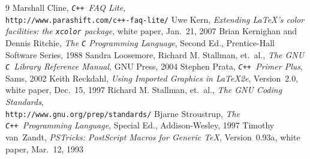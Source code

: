 \documentclass[12pt,letterpaper]{book}
\newcommand{\code}[1]{\texttt{#1}}
\newcommand{\URL}[1]{\texttt{#1}}
\newcommand{\CXX}{\code{C++}}
\newcommand{\texicomment}{}
\begin{document}
\texicomment
\begin{thebibliography}{9}
%
 Marshall Cline, \emph{\CXX\ FAQ Lite}, \\
  \URL{http://www.parashift.com/c++-faq-lite/}
%
 Uwe Kern, \emph{Extending \LaTeX's color facilities:
  the \code{xcolor} package}, white paper, Jan.~21, 2007
%
 Brian Kernighan and Dennis Ritchie, \emph{The \code{C}
    Programming Language}, Second Ed., Prentice-Hall Software Series,
    1988
%
 Sandra Loosemore, Richard M. Stallman, et.\ al.,
    \emph{The GNU \code{C}~Library Reference Manual}, GNU Press,
    2004
%
 Stephen Prata, \emph{\CXX\ Primer Plus}, Sams, 2002
%
 Keith Reckdahl, \emph{Using Imported Graphics in
  \LaTeX2e}, Version~2.0, white paper, Dec.~15, 1997
%
 Richard M. Stallman, et.\ al., \emph{The GNU
  Coding Standards}, \\
  \URL{http://www.gnu.org/prep/standards/}
%
 Bjarne Stroustrup, \emph{The \CXX\ Programming Language},
  Special Ed., Addison-Wesley, 1997
%
 Timothy van~Zandt, \emph{PSTricks: PostScript Macros for
  Generic \TeX}, Version~0.93a, white paper, Mar.~12, 1993
%
\end{thebibliography}



\printindex
\end{document}
